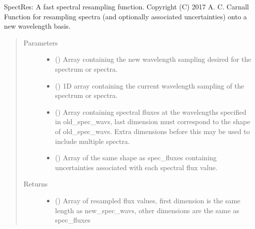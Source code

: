 \documentclass[a4paper,10pt,english]{sphinxmanual}
\begin{document}

\begin{fulllineitems}
\label{\detokenize{cascade.utilities:cascade.utilities.utilities.spectres}}
SpectRes: A fast spectral resampling function.
Copyright (C) 2017  A. C. Carnall
Function for resampling spectra (and optionally associated uncertainties)
onto a new wavelength basis.
\begin{quote}\begin{description}
\item[{Parameters}] \leavevmode\begin{itemize}
\item {} 
 () \textendash{} Array containing the new wavelength sampling desired for the spectrum
or spectra.

\item {} 
 () \textendash{} 1D array containing the current wavelength sampling of the spectrum or
spectra.

\item {} 
 () \textendash{} Array containing spectral fluxes at the wavelengths specified in
old\_spec\_wavs, last dimension must correspond to the shape of
old\_spec\_wavs.
Extra dimensions before this may be used to include multiple spectra.

\item {} 
 (\sphinxstyleliteralemphasis{\sphinxupquote{ (}}\sphinxstyleliteralemphasis{\sphinxupquote{)}}) \textendash{} Array of the same shape as spec\_fluxes containing uncertainties
associated with each spectral flux value.

\end{itemize}

\item[{Returns}] \leavevmode
\begin{itemize}
\item {} 
 () \textendash{} Array of resampled flux values, first dimension is the same length
as new\_spec\_wavs, other dimensions are the same as spec\_fluxes


\end{itemize}
\end{description}
\end{quote}
\end{fulllineitems}
\end{document}

